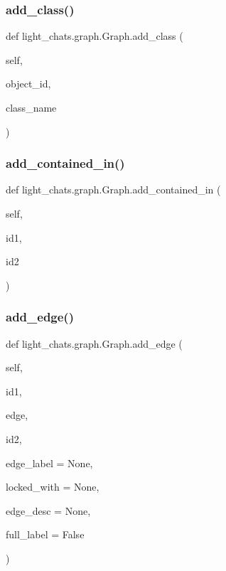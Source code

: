 \subsubsection{\texorpdfstring{add\+\_\+class()}{add\_class()}}
{\footnotesize\ttfamily def light\+\_\+chats.\+graph.\+Graph.\+add\+\_\+class (\begin{DoxyParamCaption}\item[{}]{self,  }\item[{}]{object\+\_\+id,  }\item[{}]{class\+\_\+name }\end{DoxyParamCaption})}

\mbox{\label{classlight__chats_1_1graph_1_1Graph_a764ec9d5d95e071d857644b1947a2385}} 
\subsubsection{\texorpdfstring{add\+\_\+contained\+\_\+in()}{add\_contained\_in()}}
{\footnotesize\ttfamily def light\+\_\+chats.\+graph.\+Graph.\+add\+\_\+contained\+\_\+in (\begin{DoxyParamCaption}\item[{}]{self,  }\item[{}]{id1,  }\item[{}]{id2 }\end{DoxyParamCaption})}

\mbox{\label{classlight__chats_1_1graph_1_1Graph_ab343f587ca9bf3b7576fbe93e537dbca}} 
\subsubsection{\texorpdfstring{add\+\_\+edge()}{add\_edge()}}
{\footnotesize\ttfamily def light\+\_\+chats.\+graph.\+Graph.\+add\+\_\+edge (\begin{DoxyParamCaption}\item[{}]{self,  }\item[{}]{id1,  }\item[{}]{edge,  }\item[{}]{id2,  }\item[{}]{edge\+\_\+label = {\ttfamily None},  }\item[{}]{locked\+\_\+with = {\ttfamily None},  }\item[{}]{edge\+\_\+desc = {\ttfamily None},  }\item[{}]{full\+\_\+label = {\ttfamily False} }\end{DoxyParamCaption})}

